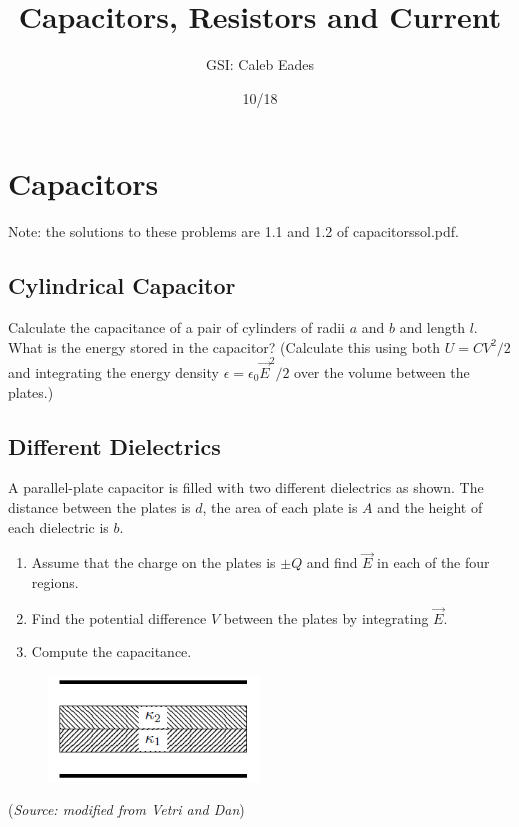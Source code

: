 \documentclass{article}
\begin{document}
\title{Capacitors, Resistors and Current}
\author{GSI: Caleb Eades}
\date{10/18}
\maketitle

\section{Capacitors}

Note: the solutions to these problems are 1.1 and 1.2 of capacitorssol.pdf.

\subsection{Cylindrical Capacitor}

Calculate the capacitance of a pair of cylinders of radii $a$ and $b$ and length $l$. What is the energy stored in the capacitor? (Calculate this using both $U=CV^2/2$ and integrating the energy density $\epsilon=\epsilon_0\vec{E}^2/2$ over the volume between the plates.)

\subsection{Different Dielectrics}

A parallel-plate capacitor is filled with two different dielectrics as shown. The distance between the plates is $d$, the area of each plate is $A$ and the height of each dielectric is $b$.
\begin{enumerate}
	\item Assume that the charge on the plates is $\pm Q$ and find $\vec{E}$ in each of the four regions.
	\item Find the potential difference $V$ between the plates by integrating $\vec{E}$. 
	\item Compute the capacitance.
\end{enumerate}
\begin{figure}
	\begin{center}
	\includegraphics[width=0.5\textwidth]{MixedDielectrics.png}
	\end{center}
\end{figure}

(\textit{Source: modified from Vetri and Dan})
\end{document}
